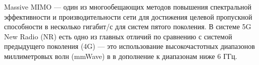 \Introduction


Massive MIMO — один из многообещающих методов повышения спектральной
эффективности и производительности сети для достижения целевой пропускной
способности в несколько гигабит/с для систем пятого поколения.
В системе 5G New Radio (NR) есть одно из главных отличий по сравнению с
системой предыдущего поколения (4G) — это использование высокочастотных диапазонов миллиметровых волн (mmWave) в
в дополнение к диапазонам ниже 6 ГГц. 

